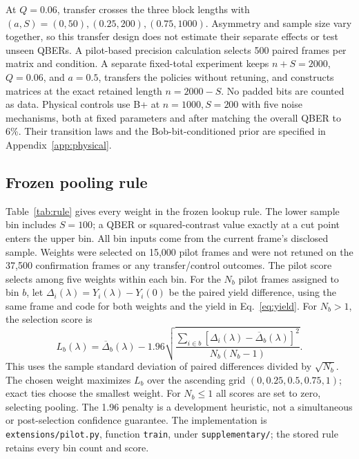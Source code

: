 At $Q=0.06$, transfer crosses the three block lengths with
$(a,S)=(0,50),(0.25,200),(0.75,1000)$. Asymmetry and sample size vary together,
so this transfer design does not estimate their separate effects or test unseen QBERs. A pilot-based precision calculation selects
500 paired frames per matrix and condition. A separate fixed-total experiment keeps
$n+S=2000$, $Q=0.06$, and $a=0.5$, transfers the policies without retuning, and
constructs matrices at the exact retained length $n=2000-S$. No padded bits are
counted as data. Physical controls use B+ at $n=1000,S=200$ with five noise
mechanisms, both at fixed parameters and after matching the overall QBER to 6\%.
Their transition laws and the Bob-bit-conditioned prior are specified in
Appendix~\ref{app:physical}.

\subsection{Frozen pooling rule}

Table~\ref{tab:rule} gives every weight in the frozen lookup rule. The lower sample bin
includes $S=100$; a QBER or squared-contrast value exactly at a cut point enters the
upper bin. All bin inputs come from the current frame's disclosed sample. Weights were
selected on 15,000 pilot frames and were not retuned on the 37,500 confirmation frames
or any transfer/control outcomes. The pilot score selects among five weights within
each bin. For the $N_b$ pilot frames assigned to bin $b$, let
$\Delta_i(\lambda)=Y_i(\lambda)-Y_i(0)$ be the paired yield difference, using
the same frame and code for both weights and the yield in Eq.~\eqref{eq:yield}.
For $N_b>1$, the selection score is
\begin{equation}
 L_b(\lambda)=\overline\Delta_b(\lambda)
 -1.96\sqrt{\frac{\sum_{i\in b}[\Delta_i(\lambda)-\overline\Delta_b(\lambda)]^2}
 {N_b(N_b-1)}}.
 \label{eq:poolingscore}
\end{equation}
This uses the sample standard deviation of paired differences divided by
$\sqrt{N_b}$. The chosen weight maximizes $L_b$ over the ascending grid
$(0,0.25,0.5,0.75,1)$; exact ties choose the smallest weight. For $N_b\leq1$
all scores are set to zero, selecting pooling. The 1.96 penalty is a development
heuristic, not a simultaneous or post-selection confidence guarantee.
The implementation is \texttt{extensions/pilot.py}, function \texttt{train},
under \texttt{supplementary/}; the stored rule retains every bin count and score.

